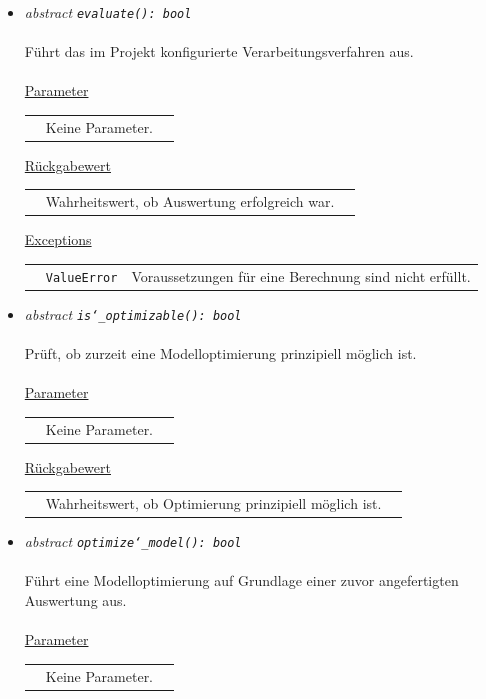 \documentclass{article}
\begin{document}
\begin{itemize}
\begin{itemize}
\item \textit{\flqq{}abstract\frqq} \texttt{\textit{evaluate(): bool}}\\\\
Führt das im Projekt konfigurierte Verarbeitungsverfahren aus.
\\\\
\underline{Parameter}\\
\begin{tabular}{lll}
 & Keine Parameter.\\
\end{tabular}

\underline{Rückgabewert}\\
\begin{tabular}{lll}
 & Wahrheitswert, ob Auswertung erfolgreich war.\\
\end{tabular}

\underline{Exceptions}\\
\begin{tabular}{lll}
 & \texttt{ValueError} & Voraussetzungen für eine Berechnung sind nicht erfüllt.\\
\end{tabular}


\item \textit{\flqq{}abstract\frqq} \texttt{\textit{is\char`_optimizable(): bool}}\\\\
Prüft, ob zurzeit eine Modelloptimierung prinzipiell möglich ist.\\\\
\underline{Parameter}\\
\begin{tabular}{lll}
 & Keine Parameter.
\end{tabular}

\underline{Rückgabewert}\\
\begin{tabular}{lll}
 & Wahrheitswert, ob Optimierung prinzipiell möglich ist.\\
\end{tabular}


\item \textit{\flqq{}abstract\frqq} \texttt{\textit{optimize\char`_model(): bool}}\\\\
Führt eine Modelloptimierung auf Grundlage einer zuvor angefertigten Auswertung aus.
\\\\
\underline{Parameter}\\
\begin{tabular}{lll}
 & Keine Parameter.\\
\end{tabular}


\end{itemize}
\end{itemize}
\end{document}
